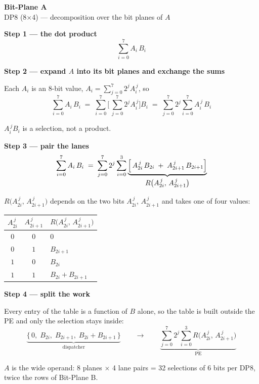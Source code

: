 \documentclass[fleqn]{article}
\newcommand{\Rf}{R\bigl(A_{2i}^{\,j},\, A_{2i+1}^{\,j}\bigr)}
\begin{document}
\begin{center}
{\LARGE \textbf{Bit-Plane A}}\\[4pt]
{\large DP8 (8$\times$4) --- decomposition over the bit planes of $A$}
\end{center}

\vspace{1.5em}

\noindent\textbf{Step 1 --- the dot product}
\[
\sum_{i=0}^{7} A_i \, B_i
\]

\vspace{0.5em}

\noindent\textbf{Step 2 --- expand $A$ into its bit planes and exchange the sums}

\noindent Each $A_i$ is an 8-bit value, $A_i = \sum_{j=0}^{7} 2^{j} A_i^{\,j}$, so
\[
\sum_{i=0}^{7} A_i \, B_i
  \;=\; \sum_{i=0}^{7} \Biggl[\, \sum_{j=0}^{7} 2^{j} A_i^{\,j} \Biggr] B_i
  \;=\; \sum_{j=0}^{7} 2^{j} \sum_{i=0}^{7} A_i^{\,j} \, B_i
\]

\noindent $A_i^{\,j} B_i$ is a selection, not a product.

\vspace{0.5em}

\noindent\textbf{Step 3 --- pair the lanes}
\[
\sum_{i=0}^{7} A_i \, B_i
  \;=\; \sum_{j=0}^{7} 2^{j} \sum_{i=0}^{3}
        \underbrace{\Bigl[\, A_{2i}^{\,j} \, B_{2i} \;+\; A_{2i+1}^{\,j} \, B_{2i+1} \Bigr]}_{\textstyle \Rf}
\]

\noindent $\Rf$ depends on the two bits $A_{2i}^{\,j}$, $A_{2i+1}^{\,j}$ and takes one of
four values:

\vspace{1em}

\begin{center}
\renewcommand{\arraystretch}{1.35}
\begin{tabular}{c c | l}
$A_{2i}^{\,j}$ & $A_{2i+1}^{\,j}$ & \multicolumn{1}{c}{$\Rf$} \\
\hline
$0$ & $0$ & $0$ \\
$0$ & $1$ & $B_{2i+1}$ \\
$1$ & $0$ & $B_{2i}$ \\
$1$ & $1$ & $B_{2i} + B_{2i+1}$ \\
\end{tabular}
\end{center}

\vspace{1.5em}

\noindent\textbf{Step 4 --- split the work}

\noindent Every entry of the table is a function of $B$ alone, so the table is built
outside the PE and only the selection stays inside:
\[
\underbrace{\bigl\{\, 0,\; B_{2i},\; B_{2i+1},\; B_{2i} + B_{2i+1} \,\bigr\}}_{\textstyle \text{dispatcher}}
\qquad\longrightarrow\qquad
\underbrace{\sum_{j=0}^{7} 2^{j} \sum_{i=0}^{3} \Rf}_{\textstyle \text{PE}}
\]

\vspace{1.5em}

\noindent $A$ is the wide operand: 8 planes $\times$ 4 lane pairs = 32 selections of
6 bits per DP8, twice the rows of Bit-Plane B.
\end{document}
